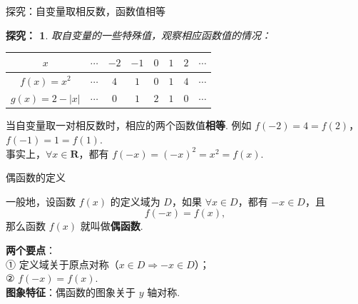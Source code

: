 \documentclass[aspectratio=169,13pt,t] {beamer}
\newtheorem{exploration}{探究：}
\theoremstyle{definition}
\begin{document}
\begin{frame}{探究：自变量取相反数，函数值相等}
	\begin{exploration}
	取自变量的一些特殊值，观察相应函数值的情况：
	\end{exploration}
	\begin{center}
		\renewcommand{\arraystretch}{1.3}
		\begin{tabular}{|c|c|c|c|c|c|c|c|}
			\hline
			\(x\) & \(\cdots\) & \(-2\) & \(-1\) & \(0\) & \(1\) & \(2\) & \(\cdots\) \\ \hline
			\(f(x)=x^2\) & \(\cdots\) & \(4\) & \(1\) & \(0\) & \(1\) & \(4\) & \(\cdots\) \\ \hline
			\(g(x)=2-|x|\) & \(\cdots\) & \(0\) & \(1\) & \(2\) & \(1\) & \(0\) & \(\cdots\) \\ \hline
		\end{tabular}
	\end{center}
	\pause
	\begin{summarybox-answer}
	当自变量取一对相反数时，相应的两个函数值\textbf{相等}. 例如 \(f(-2)=4=f(2)\)，\(f(-1)=1=f(1)\).\\
	事实上，\(\forall x\in\mathbf{R}\)，都有 \(f(-x)=(-x)^2=x^2=f(x)\).
	\end{summarybox-answer}
\end{frame}

\begin{frame}{偶函数的定义}
	\begin{summarybox}
	一般地，设函数 \(f(x)\) 的定义域为 \(D\)，如果 \(\forall x\in D\)，都有 \(-x\in D\)，且
	\[
		f(-x)=f(x),
	\]
	那么函数 \(f(x)\) 就叫做\textbf{偶函数}.
	\end{summarybox}
	\vspace{0.5em}
	\begin{summarybox-answer}
	\textbf{两个要点}：\\
	① 定义域关于原点对称（\(x\in D\Rightarrow -x\in D\)）；\\
	② \(f(-x)=f(x)\).\\[3pt]
	\textbf{图象特征}：偶函数的图象关于 \(y\) 轴对称.
	\end{summarybox-answer}
\end{frame}
\end{document}
